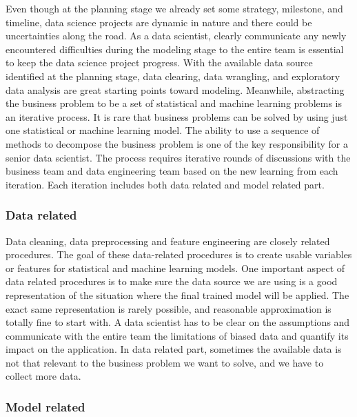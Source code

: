 \documentclass[12pt,]{krantz}
\begin{document}
Even though at the planning stage we already set some strategy, milestone, and timeline, data science projects are dynamic in nature and there could be uncertainties along the road. As a data scientist, clearly communicate any newly encountered difficulties during the modeling stage to the entire team is essential to keep the data science project progress. With the available data source identified at the planning stage, data clearing, data wrangling, and exploratory data analysis are great starting points toward modeling. Meanwhile, abstracting the business problem to be a set of statistical and machine learning problems is an iterative process. It is rare that business problems can be solved by using just one statistical or machine learning model. The ability to use a sequence of methods to decompose the business problem is one of the key responsibility for a senior data scientist. The process requires iterative rounds of discussions with the business team and data engineering team based on the new learning from each iteration. Each iteration includes both data related and model related part.

\hypertarget{data-related}{%
\subsubsection{Data related}\label{data-related}}

Data cleaning, data preprocessing and feature engineering are closely related procedures. The goal of these data-related procedures is to create usable variables or features for statistical and machine learning models. One important aspect of data related procedures is to make sure the data source we are using is a good representation of the situation where the final trained model will be applied. The exact same representation is rarely possible, and reasonable approximation is totally fine to start with. A data scientist has to be clear on the assumptions and communicate with the entire team the limitations of biased data and quantify its impact on the application. In data related part, sometimes the available data is not that relevant to the business problem we want to solve, and we have to collect more data.

\hypertarget{model-related}{%
\subsubsection{Model related}\label{model-related}}
\end{document}
